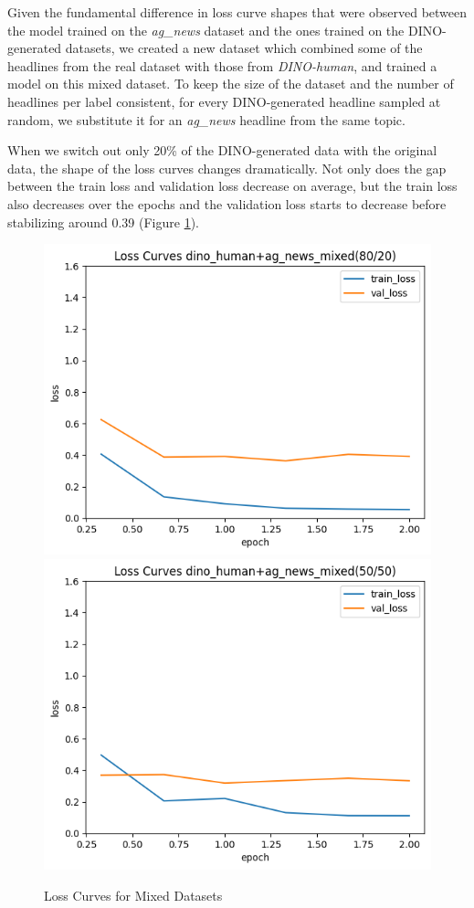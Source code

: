 \documentclass[11pt]{article}
\begin{document}
Given the fundamental difference in loss curve shapes that were observed between the model trained on the \textit{ag\_news} dataset and the ones trained on the DINO-generated datasets, we created a new dataset which combined some of the headlines from the real dataset with those from \textit{DINO-human}, and trained a model on this mixed dataset. To keep the size of the dataset and the number of headlines per label consistent, for every DINO-generated headline sampled at random, we substitute it for an \textit{ag\_news} headline from the same topic.

When we switch out only 20\% of the DINO-generated data with the original data, the shape of the loss curves changes dramatically. Not only does the gap between the train loss and validation loss decrease on average, but the train loss also decreases over the epochs and the validation loss starts to decrease before stabilizing around 0.39 (Figure \ref{fig:mixedloss}). 

\begin{figure}
    \centering
    \includegraphics[width=0.9\linewidth]{figures/mixed_dataset_80:20.png}
    \includegraphics[width=0.9\linewidth]{figures/mixed_dataset_50 50.png}
    \caption{Loss Curves for Mixed Datasets}
    \label{fig:mixedloss}
\end{figure}
\end{document}
